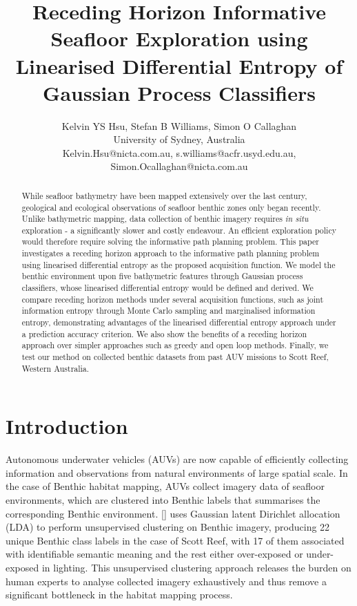 \documentclass{article}
\title{Receding Horizon Informative Seafloor Exploration using Linearised Differential Entropy of Gaussian Process Classifiers}
\author{Kelvin YS Hsu, Stefan B Williams, Simon O Callaghan \\ University of Sydney, Australia \\ 
Kelvin.Hsu@nicta.com.au, s.williams@acfr.usyd.edu.au, Simon.Ocallaghan@nicta.com.au}
\begin{document}
\maketitle

\begin{abstract}
	While seafloor bathymetry have been mapped extensively over the last century, geological and ecological observations of seafloor benthic zones only began recently. Unlike bathymetric mapping, data collection of benthic imagery requires \textit{in situ} exploration - a significantly slower and costly endeavour. An efficient exploration policy would therefore require solving the informative path planning problem. This paper investigates a receding horizon approach to the informative path planning problem using linearised differential entropy as the proposed acquisition function. We model the benthic environment upon five bathymetric features through Gaussian process classifiers, whose linearised differential entropy would be defined and derived. We compare receding horizon methods under several acquisition functions, such as joint information entropy through Monte Carlo sampling and marginalised information entropy, demonstrating advantages of the linearised differential entropy approach under a prediction accuracy criterion. We also show the benefits of a receding horizon approach over simpler approaches such as greedy and open loop methods. Finally, we test our method on collected benthic datasets from past AUV missions to Scott Reef, Western Australia.
\end{abstract}

\section{Introduction}
\label{Section:Introduction}

	Autonomous underwater vehicles (AUVs) are now capable of efficiently collecting information and observations from natural environments of large spatial scale. In the case of Benthic habitat mapping, AUVs collect imagery data of seafloor environments, which are clustered into Benthic labels that summarises the corresponding Benthic environment. \citeauthor{Steinberg2015128} [\citeyear{Steinberg2015128}] uses Gaussian latent Dirichlet allocation (LDA) to perform unsupervised clustering on Benthic imagery, producing 22 unique Benthic class labels in the case of Scott Reef, with 17 of them associated with identifiable semantic meaning and the rest either over-exposed or under-exposed in lighting. This unsupervised clustering approach releases the burden on human experts to analyse collected imagery exhaustively and thus remove a significant bottleneck in the habitat mapping process.
	
\end{document}
